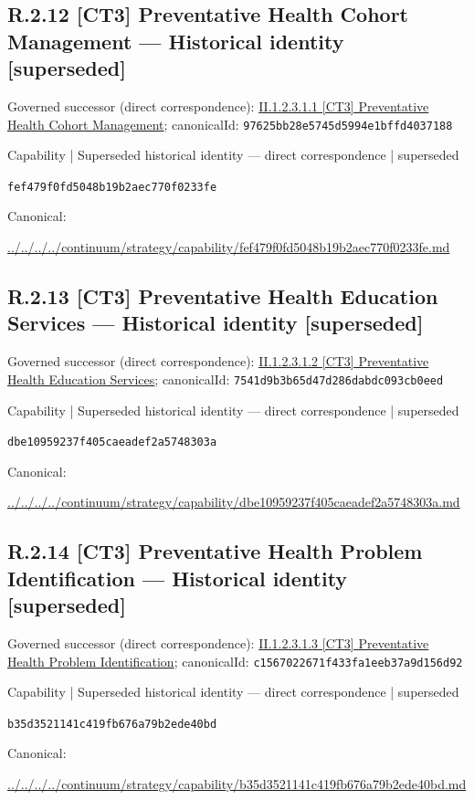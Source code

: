 \documentclass[10pt,a4paper]{article}
\begin{document}
\subsection*{R.2.12 [CT3] Preventative Health Cohort Management — Historical identity [superseded]}
Governed successor (direct correspondence): \hyperref[element-97625bb28e5745d5994e1bffd4037188]{II.1.2.3.1.1 [CT3] Preventative Health Cohort Management}; canonicalId: \texttt{97625bb28e5745d5994e1bffd4037188}\par
\label{element-fef479f0fd5048b19b2aec770f0233fe}
{\small Capability | Superseded historical identity — direct correspondence | superseded}\par
\texttt{fef479f0fd5048b19b2aec770f0233fe}\par
Canonical: \par
{\footnotesize\url{../../../../continuum/strategy/capability/fef479f0fd5048b19b2aec770f0233fe.md}}\par
\subsection*{R.2.13 [CT3] Preventative Health Education Services — Historical identity [superseded]}
Governed successor (direct correspondence): \hyperref[element-7541d9b3b65d47d286dabdc093cb0eed]{II.1.2.3.1.2 [CT3] Preventative Health Education Services}; canonicalId: \texttt{7541d9b3b65d47d286dabdc093cb0eed}\par
\label{element-dbe10959237f405caeadef2a5748303a}
{\small Capability | Superseded historical identity — direct correspondence | superseded}\par
\texttt{dbe10959237f405caeadef2a5748303a}\par
Canonical: \par
{\footnotesize\url{../../../../continuum/strategy/capability/dbe10959237f405caeadef2a5748303a.md}}\par
\subsection*{R.2.14 [CT3] Preventative Health Problem Identification — Historical identity [superseded]}
Governed successor (direct correspondence): \hyperref[element-c1567022671f433fa1eeb37a9d156d92]{II.1.2.3.1.3 [CT3] Preventative Health Problem Identification}; canonicalId: \texttt{c1567022671f433fa1eeb37a9d156d92}\par
\label{element-b35d3521141c419fb676a79b2ede40bd}
{\small Capability | Superseded historical identity — direct correspondence | superseded}\par
\texttt{b35d3521141c419fb676a79b2ede40bd}\par
Canonical: \par
{\footnotesize\url{../../../../continuum/strategy/capability/b35d3521141c419fb676a79b2ede40bd.md}}\par
\end{document}
